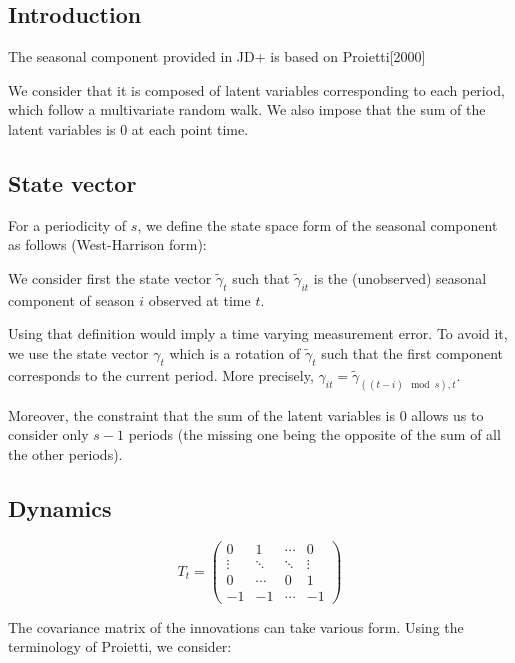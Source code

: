 \documentclass[
  letterpaper,
  DIV=11,
  numbers=noendperiod]{scrreprt}
\begin{document}
\subsection{Introduction}\label{introduction-4}

The seasonal component provided in JD+ is based on Proietti{[}2000{]}

We consider that it is composed of latent variables corresponding to
each period, which follow a multivariate random walk. We also impose
that the sum of the latent variables is 0 at each point time.

\subsection{State vector}\label{state-vector-6}

For a periodicity of \(s\), we define the state space form of the
seasonal component as follows (West-Harrison form):

We consider first the state vector \(\tilde \gamma_t\) such that
\(\tilde \gamma_{it}\) is the (unobserved) seasonal component of season
\(i\) observed at time \(t\).

Using that definition would imply a time varying measurement error. To
avoid it, we use the state vector \(\gamma_t\) which is a rotation of
\(\tilde \gamma_t\) such that the first component corresponds to the
current period. More precisely,
\(\gamma_{it} =\tilde\gamma_{\left( \left(t-i\right) \mod s \right), t}\).

Moreover, the constraint that the sum of the latent variables is 0
allows us to consider only \(s-1\) periods (the missing one being the
opposite of the sum of all the other periods).

\subsection{Dynamics}\label{dynamics-6}

\[ T_t = \begin{pmatrix} 0 & 1 & \cdots & 0 \\ \vdots & \ddots & \ddots & \vdots \\ 0 &  \cdots & 0 & 1  \\ -1 & -1 & \cdots & -1\end{pmatrix}\]

The covariance matrix of the innovations can take various form. Using
the terminology of Proietti, we consider:
\end{document}
